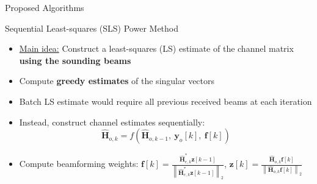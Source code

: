 \documentclass[pdf]{beamer}
\begin{document}
\begin{frame}[t]
\begin{textblock}{0.98}
\begin{tcbraster}[%
    raster columns = 2,
    raster column skip = 0.01\paperwidth,
    raster row skip = 0.01\paperwidth,
    raster equal height=rows
    ]
  \begin{mybox}[%
    sidebyside=false,
    left=4pt,
    right=4pt,
    ]{Proposed Algorithms}
    \begin{mysubbox}[%
      sidebyside,
      lower separated=false,
      ]{Sequential Least-squares (SLS) Power Method}
      \small
      \addtolength{\leftmargini}{\labelsep}
      \begin{itemize}
      \item \underline{Main idea:} Construct a least-squares (LS) estimate of the channel matrix \textbf{using the sounding beams}
      \item Compute \textbf{greedy estimates} of the singular vectors
      \item Batch LS estimate would require all previous received beams at each iteration
      \end{itemize}
      \tcblower
      \small
      \addtolength{\leftmargini}{\labelsep}
      \begin{itemize}
      \item Instead, construct channel estimates sequentially:
        $$\widehat{\mathbf{H}}_{o,k} = f \left(\widehat{\mathbf{H}}_{o,k-1},\ \mathbf{y}_{o}[k],\ \mathbf{f}[k]\right)$$
      \item Compute beamforming weights: $\mathbf{f}[k] = \frac{\widehat{\mathbf{H}}_{e,k}^* \mathbf{z}[k-1]}{\left\|\widehat{\mathbf{H}}_{e,k}^* \mathbf{z}[k-1]\right\|_{2}}$,
        $\mathbf{z}[k] = \frac{\widehat{\mathbf{H}}_{o,k} \mathbf{f}[k]}{\left\|\widehat{\mathbf{H}}_{o,k} \mathbf{f}[k]\right\|_{2}}$
      \end{itemize}
    \end{mysubbox}


\end{mybox}
\end{tcbraster}
\end{textblock}
\end{frame}
\end{document}
